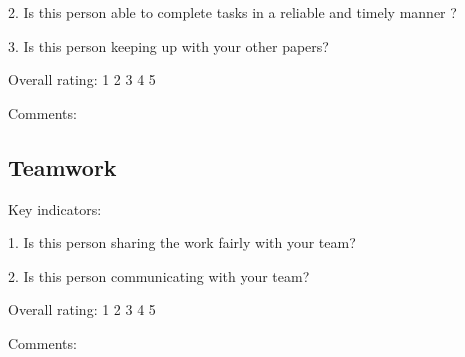 \documentclass{article}   	%
\begin{document}
2.  Is this person able to complete tasks in a reliable and timely manner ?

3.  Is this person keeping up with your other papers?

Overall rating: \hskip 1cm 1 \hskip 1cm 2 \hskip 1cm 3 \hskip 1cm 4 \hskip 1cm 5 

Comments:

\vskip 4cm

\subsection*{Teamwork}

Key indicators: 

1.  Is this person sharing the work fairly with your team?

2.  Is this person communicating with your team?


Overall rating: \hskip 1cm 1 \hskip 1cm 2 \hskip 1cm 3 \hskip 1cm 4 \hskip 1cm 5 

Comments:

\vskip 4cm
\end{document}
